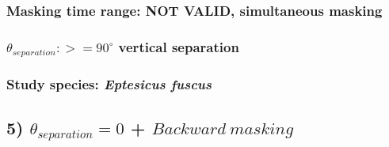 \documentclass[11pt]{article}
\begin{document}
\hypertarget{masking-time-range-not-valid-simultaneous-masking}{%
\subsubsection{Masking time range: NOT VALID, simultaneous
masking}\label{masking-time-range-not-valid-simultaneous-masking}}

\hypertarget{theta_separation-90circ-vertical-separation}{%
\subsubsection{\texorpdfstring{\(\theta_{separation}: >=90^{\circ}\)
vertical
separation}{\textbackslash{}theta\_\{separation\}: \textgreater{}=90\^{}\{\textbackslash{}circ\} vertical separation}}\label{theta_separation-90circ-vertical-separation}}

\hypertarget{study-species-eptesicus-fuscus}{%
\subsubsection{\texorpdfstring{Study species: \emph{Eptesicus
fuscus}}{Study species: Eptesicus fuscus}}\label{study-species-eptesicus-fuscus}}

    \hypertarget{theta_separation-0-backward-masking}{%
\subsection{\texorpdfstring{5) \(\theta_{separation} = 0\) +
\(Backward\ masking\)}{5) \textbackslash{}theta\_\{separation\} = 0 + Backward\textbackslash{} masking}}\label{theta_separation-0-backward-masking}}
\end{document}
